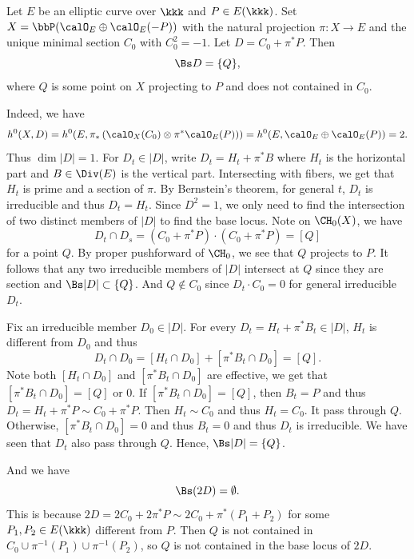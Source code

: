   \begin{example}
    Let $E$ be an elliptic curve over $\kkk$ and $P \in E(\kkk)$.
    Set $X = \bbP(\calO_E \oplus \calO_E(-P))$ with the natural projection $\pi: X \to E$ and the unique minimal section $C_0$ with $C_0^2 = -1$.
    Let $D = C_0 + \pi^*P$.
    Then 
    \[ \Bs D = \{Q\}, \]
    where $Q$ is some point on $X$ projecting to $P$ and does not contained in $C_0$.

    Indeed, we have 
    \[ h^0(X, D) = h^0(E, \pi_*\left(\calO_X(C_0) \otimes \pi^*\calO_E(P) \right)) = h^0(E, \calO_E \oplus \calO_E(P)) = 2. \]
    Thus $\dim |D| = 1$.
    For $D_t \in |D|$, write $D_t = H_t + \pi^*B$ where $H_t$ is the horizontal part and $B \in \Div(E)$ is the vertical part.
    Intersecting with fibers, we get that $H_t$ is prime and a section of $\pi$.
    By Bernstein's theorem, for general $t$, $D_t$ is irreducible and thus $D_t = H_t$.
    Since $D^2 = 1$, we only need to find the intersection of two distinct members of $|D|$ to find the base locus.
    Note on $\CH_0(X)$, we have 
    \[ D_t \cap D_s = (C_0 + \pi^*P) \cdot (C_0 + \pi^*P) = [Q] \]
    for a point $Q$.
    By proper pushforward of $\CH_0$, we see that $Q$ projects to $P$.
    It follows that any two irreducible members of $|D|$ intersect at $Q$ since they are section and $\Bs |D| \subset \{Q\}$.
    And $Q \not\in C_0$ since $D_t \cdot C_0 = 0$ for general irreducible $D_t$.
    
    Fix an irreducible member $D_0 \in |D|$.
    For every $D_t = H_t + \pi^*B_t \in |D|$, $H_t$ is different from $D_0$ and thus 
    \[ D_t \cap D_0 = [H_t \cap D_0] + [\pi^*B_t \cap D_0] = [Q]. \]
    Note both $[H_t \cap D_0]$ and $[\pi^*B_t \cap D_0]$ are effective, we get that $[\pi^*B_t \cap D_0] = [Q]$ or $0$.
    If $[\pi^*B_t \cap D_0] = [Q]$, then $B_t = P$ and thus $D_t = H_t + \pi^*P \sim C_0 + \pi^*P$.
    Then $H_t \sim C_0$ and thus $H_t = C_0$.
    It pass through $Q$.
    Otherwise, $[\pi^*B_t \cap D_0] = 0$ and thus $B_t = 0$ and thus $D_t$ is irreducible.
    We have seen that $D_t$ also pass through $Q$.
    Hence, $\Bs |D| = \{Q\}$.

    And we have 
    \[ \Bs(2D) = \emptyset. \]
    This is because $2D = 2C_0 + 2\pi^*P \sim 2C_0 + \pi^*(P_1+P_2)$ for some $P_1,P_2 \in E(\kkk)$ different from $P$.
    Then $Q$ is not contained in $C_0 \cup \pi^{-1}(P_1) \cup \pi^{-1}(P_2)$, so $Q$ is not contained in the base locus of $2D$.
  \end{example}

